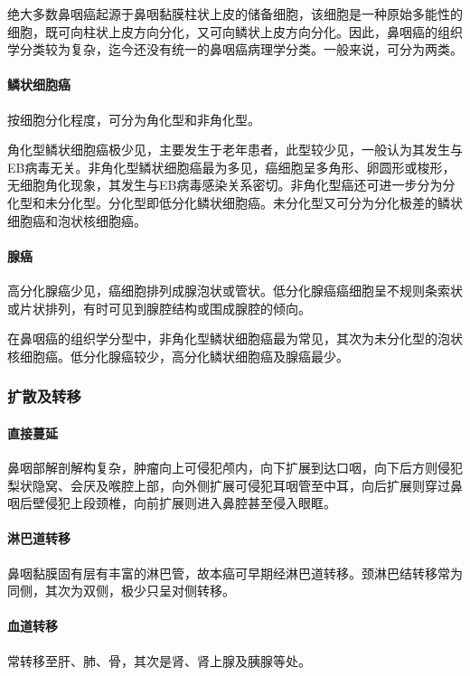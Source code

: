绝大多数鼻咽癌起源于鼻咽黏膜柱状上皮的储备细胞，该细胞是一种原始多能性的细胞，既可向柱状上皮方向分化，又可向鳞状上皮方向分化。因此，鼻咽癌的组织学分类较为复杂，迄今还没有统一的鼻咽癌病理学分类。一般来说，可分为两类。

\paragraph{鳞状细胞癌}
按细胞分化程度，可分为角化型和非角化型。

角化型鳞状细胞癌极少见，主要发生于老年患者，此型较少见，一般认为其发生与EB病毒无关。非角化型鳞状细胞癌最为多见，癌细胞呈多角形、卵圆形或梭形，无细胞角化现象，其发生与EB病毒感染关系密切。非角化型癌还可进一步分为分化型和未分化型。分化型即低分化鳞状细胞癌。未分化型又可分为分化极差的鳞状细胞癌和泡状核细胞癌。

\paragraph{腺癌}
高分化腺癌少见，癌细胞排列成腺泡状或管状。低分化腺癌癌细胞呈不规则条索状或片状排列，有时可见到腺腔结构或围成腺腔的倾向。

在鼻咽癌的组织学分型中，非角化型鳞状细胞癌最为常见，其次为未分化型的泡状核细胞癌。低分化腺癌较少，高分化鳞状细胞癌及腺癌最少。

\subsubsection{扩散及转移}

\paragraph{直接蔓延}
鼻咽部解剖解构复杂，肿瘤向上可侵犯颅内，向下扩展到达口咽，向下后方则侵犯梨状隐窝、会厌及喉腔上部，向外侧扩展可侵犯耳咽管至中耳，向后扩展则穿过鼻咽后壁侵犯上段颈椎，向前扩展则进入鼻腔甚至侵入眼眶。

\paragraph{淋巴道转移}
鼻咽黏膜固有层有丰富的淋巴管，故本癌可早期经淋巴道转移。颈淋巴结转移常为同侧，其次为双侧，极少只呈对侧转移。

\paragraph{血道转移}
常转移至肝、肺、骨，其次是肾、肾上腺及胰腺等处。

